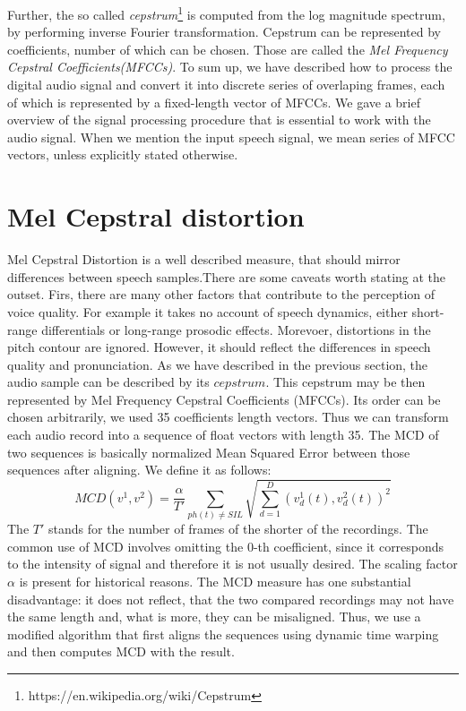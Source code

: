 Further, the so called \textit{cepstrum}\footnote{https://en.wikipedia.org/wiki/Cepstrum} is computed from the log magnitude spectrum, by performing inverse Fourier transformation.
Cepstrum can be represented by coefficients, number of which can be chosen.
Those are called the \textit{Mel Frequency Cepstral Coefficients(MFCCs)}.
To sum up, we have described how to process the digital audio signal and convert it into discrete series of overlaping frames, each of which is represented by a fixed-length vector of MFCCs.
\linebreak\linebreak
We gave a brief overview of the signal processing procedure that is essential to work with the audio signal.
When we mention the input speech signal, we mean series of MFCC vectors, unless explicitly stated otherwise.
\section{Mel Cepstral distortion}
Mel Cepstral Distortion \cite{kubichek1993mel} is a well described measure, that should mirror differences between speech samples.There are some caveats worth stating at the outset.
Firs, there are many other factors that contribute to the perception of voice quality.
For example it takes no account of speech dynamics, either short-range differentials or long-range prosodic
effects.
Morevoer, distortions in the pitch contour are ignored.
However, it should reflect the differences in speech quality and pronunciation.
\linebreak\linebreak
As we have described in the previous section, the audio sample can be described by its $cepstrum$.
This cepstrum may be then represented by Mel Frequency Cepstral Coefficients (MFCCs). Its order can be chosen arbitrarily, we used 35 coefficients length vectors. Thus we can transform each audio record into a sequence of float vectors with length 35. The MCD \cite{kubichek1993mel} of two sequences is basically normalized Mean Squared Error between those sequences after aligning. We define it as follows:
\begin{equation}
MCD(v^1, v^2) = \frac{\alpha}{T'}\sum_{ph(t) \neq SIL}\sqrt{\sum_{d=1}^{D}(v_d^1(t), v_d^2(t))^2}
\end{equation}
The $T'$ stands for the number of frames of the shorter of the recordings.
The common use of MCD involves omitting the $0$-th coefficient, since it corresponds to the intensity of signal and therefore it is not usually desired. The scaling factor $\alpha$ is present for historical reasons.
\linebreak\linebreak
The MCD measure has one substantial disadvantage: it does not reflect, that the two compared recordings may not have the same length and, what is more, they can be misaligned.
Thus, we use a modified algorithm that first aligns the sequences using dynamic time warping and then computes MCD with the result.
